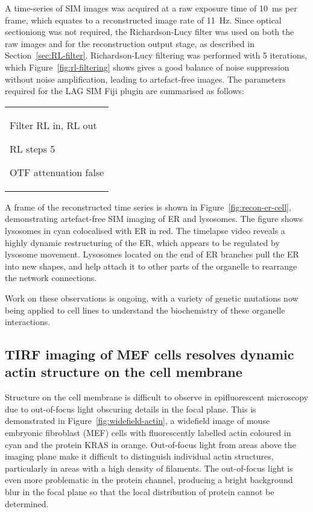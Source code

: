 A time-series of SIM images was acquired at a raw exposure time of \SI{10}{\milli\second} per frame, which equates to a reconstructed image rate of \SI{11}{\hertz}.
Since optical sectioniong was not required, the Richardson-Lucy filter was used on both the raw images and for the reconstruction output stage, as described in Section~\ref{sec:RL-filter}.
Richardson-Lucy filtering was performed with 5 iterations, which Figure~\ref{fig:rl-filtering} shows gives a good balance of noise suppression without noise amplification, leading to artefact-free images.
The parameters required for the LAG SIM Fiji plugin are summarised as follows:
\newline
\begin{tabular}{p{}}
\begin{labelling}[margin=OTF attenuation]
	\item[Filter] RL in, RL out
	\item[RL steps] 5
	\item[OTF attenuation] false
\end{labelling}
\end{tabular}

A frame of the reconstructed time series is shown in Figure~\ref{fig:recon-er-cell}, demonstrating artefact-free SIM imaging of ER and lysosomes.
The figure shows lysosomes in cyan colocalised with ER in red.
The timelapse video reveals a highly dynamic restructuring of the ER, which appears to be regulated by lysosome movement.
Lysosomes located on the end of ER branches pull the ER into new shapes, and help attach it to other parts of the organelle to rearrange the network connections.

Work on these observations is ongoing, with a variety of genetic mutations now being applied to cell lines to understand the biochemistry of these organelle interactions.

\subsection{TIRF imaging of MEF cells resolves dynamic actin structure on the cell membrane}
Structure on the cell membrane is difficult to observe in epifluorescent microscopy due to out-of-focus light obscuring details in the focal plane.
This is demonstrated in Figure~\ref{fig:widefield-actin}, a widefield image of mouse embryonic fibroblast (MEF) cells with fluorescently labelled actin coloured in cyan and the protein KRAS in orange.
Out-of-focus light from areas above the imaging plane make it difficult to distinguish individual actin structures, particularly in areas with a high density of filaments.
The out-of-focus light is even more problematic in the protein channel, producing a bright background blur in the focal plane so that the local distribution of protein cannot be determined.

